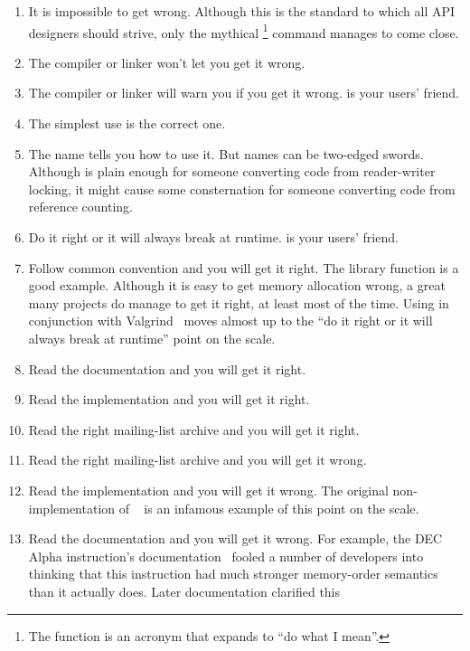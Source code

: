 \begin{enumerate}
\item	It is impossible to get wrong.
	Although this is the standard to which all API designers should
	strive, only the mythical \footnote{
		The  function is an acronym that expands to
		``do what I mean''.}
	command manages to come close.
\item	The compiler or linker won't let you get it wrong.
\item	The compiler or linker will warn you if you get it wrong.
	 is your users' friend.
\item	The simplest use is the correct one.
\item	The name tells you how to use it.
	But names can be two-edged swords.
	Although  is plain enough for someone
	converting code from reader-writer locking, it might cause
	some consternation for someone converting code from
	reference counting.
\item	Do it right or it will always break at runtime.
	 is your users' friend.
\item	Follow common convention and you will get it right.
	The  library function is a good example.
	Although it is easy to get memory allocation wrong, a
	great many projects do manage to get it right, at least most
	of the time.
	Using  in conjunction with
	Valgrind~\cite{ValgrindHomePage} moves 
	almost up to the ``do it right or it will always break at runtime''
	point on the scale.
\item	Read the documentation and you will get it right.
\item	Read the implementation and you will get it right.
\item	Read the right mailing-list archive and you will get it right.
\item	Read the right mailing-list archive and you will get it wrong.
\item	Read the implementation and you will get it wrong.
	The original non- implementation of
	~\cite{PaulEMcKenney2007PreemptibleRCU}
	is an infamous example of this point on the scale.
\item	Read the documentation and you will get it wrong.
	For example, the DEC Alpha  instruction's
	documentation~\cite{ALPHA2002} fooled a
	number of developers into thinking that this instruction
	had much stronger memory-order semantics than it actually does.
	Later documentation clarified this

\end{enumerate}
